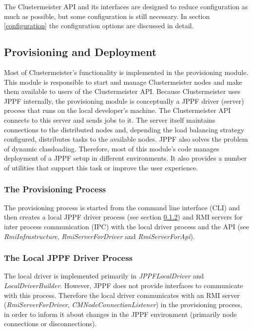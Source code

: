 \documentclass[english]{uzhpub}
\begin{document}
The Clustermeister API and its interfaces are designed to reduce configuration as much as possible, but some configuration is still necessary. In section \ref{configuration} the configuration options are discussed in detail.

\subsection{Provisioning and Deployment}
Most of Clustermeister's functionality is implemented in the provisioning module. This module is responsible to start and manage Clustermeister nodes and make them available to users of the Clustermeister API. Because Clustermeister uses JPPF internally, the provisioning module is conceptually a JPPF driver (server) process that runs on the local developer's machine. The Clustermeister API connects to this server and sends jobs to it. The server itself maintains connections to the distributed nodes and, depending the load balancing strategy configured, distributes tasks to the available nodes. JPPF also solves the problem of dynamic classloading. Therefore, most of this module's code manages deployment of a JPPF setup in different environments. It also provides a number of utilities that support this task or improve the user experience.

\subsubsection{The Provisioning Process}
The provisioning process is started from the command line interface (CLI) and then creates a local JPPF driver process (see section \ref{localdriver}) and RMI servers for inter process communication (IPC) with the local driver process and the API (see \textit{RmiInfrastructure}, \textit{RmiServerForDriver} and \textit{RmiServerForApi}).

\subsubsection{The Local JPPF Driver Process}
\label{localdriver}
The local driver is implemented primarily in \textit{JPPFLocalDriver} and \textit{LocalDriverBuilder}. However, JPPF does not provide interfaces to communicate with this process. Therefore the local driver communicates with an RMI server (\textit{RmiServerForDriver}, \textit{CMNodeConnectionListener}) in the provisioning process, in order to inform it about changes in the JPPF environment (primarily node connections or disconnections).
\end{document}

